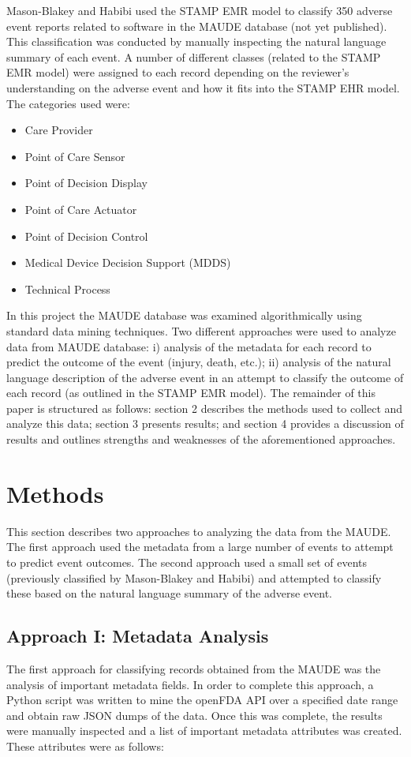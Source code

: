\documentclass[11pt, notitlepage,abstracton,oneside]{article}   	%
\begin{document}
Mason-Blakey and Habibi used the STAMP EMR model to classify 350 adverse event reports related to software in the MAUDE database (not yet published). This classification was conducted by manually inspecting the natural language summary of each event. A number of different classes (related to the STAMP EMR model) were assigned to each record depending on the reviewer's understanding on the adverse event and how it fits into the STAMP EHR model. The categories used were: 

\begin{itemize}
	\item Care Provider
	\item Point of Care Sensor
	\item Point of Decision Display
	\item Point of Care Actuator
	\item Point of Decision Control
	\item Medical Device Decision Support (MDDS)
	\item Technical Process
\end{itemize}

In this project the MAUDE database was examined algorithmically using standard data mining techniques. Two different approaches were used to analyze data from MAUDE database:  i) analysis of the metadata for each record to predict the outcome of the event (injury, death, etc.); ii) analysis of the natural language description of the adverse event in an attempt to classify the outcome of each record (as outlined in the STAMP EMR model). The remainder of this paper is structured as follows: section 2 describes the methods used to collect and analyze this data; section 3 presents results; and section 4 provides a discussion of results and outlines strengths and weaknesses of the aforementioned approaches. 

\section{Methods}
This section describes two approaches to analyzing the data from the MAUDE. The first approach used the metadata from a large number of events to attempt to predict event outcomes. The second approach used a small set of events (previously classified by Mason-Blakey and Habibi) and attempted to classify these based on the natural language summary of the adverse event.

\subsection{Approach I: Metadata Analysis}
The first approach for classifying records obtained from the MAUDE was the analysis of important metadata fields. In order to complete this approach, a Python script was written to mine the openFDA API over a specified date range and obtain raw JSON dumps of the data. Once this was complete, the results were manually inspected and a list of important metadata attributes was created. These attributes were as follows:
\end{document}

